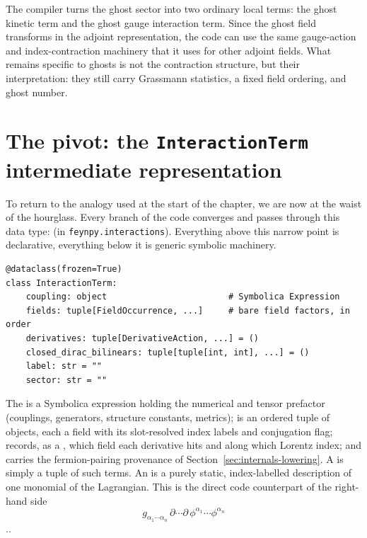 The compiler turns the ghost sector into two ordinary local terms: the ghost kinetic term and the ghost gauge interaction term. Since the ghost field transforms in the adjoint representation, the code can use the same gauge-action and index-contraction machinery that it uses for other adjoint fields. What remains specific to ghosts is not the contraction structure, but their interpretation: they still carry Grassmann statistics, a fixed field ordering, and ghost number.

\section{The pivot: the \texttt{InteractionTerm} intermediate representation}
\label{sec:internals-ir}
To return to the analogy used at the start of the chapter, we are now at the waist of the hourglass. Every branch of the code converges and passes through this data type:  (in \texttt{feynpy.interactions}). Everything above this narrow point is declarative, everything below it is generic symbolic machinery.

\begin{verbatim}
@dataclass(frozen=True)
class InteractionTerm:
    coupling: object                        # Symbolica Expression
    fields: tuple[FieldOccurrence, ...]     # bare field factors, in order
    derivatives: tuple[DerivativeAction, ...] = ()
    closed_dirac_bilinears: tuple[tuple[int, int], ...] = ()
    label: str = ""
    sector: str = ""
\end{verbatim}

The  is a Symbolica expression holding the numerical and tensor prefactor (couplings, generators, structure constants, metrics);  is an ordered tuple of  objects, each a field with its slot-resolved index labels and conjugation flag;  records, as a , which field each derivative hits and along which Lorentz index; and  carries the fermion-pairing provenance of Section~\ref{sec:internals-lowering}. A  is simply a tuple of such terms. An  is a purely static, index-labelled description of one monomial of the Lagrangian. This is the direct code counterpart of the right-hand side
\[
    g_{\alpha_1\cdots\alpha_n}\,
    \partial\cdots\partial\,
    \phi^{\alpha_1}\cdots\phi^{\alpha_n}
\]..

